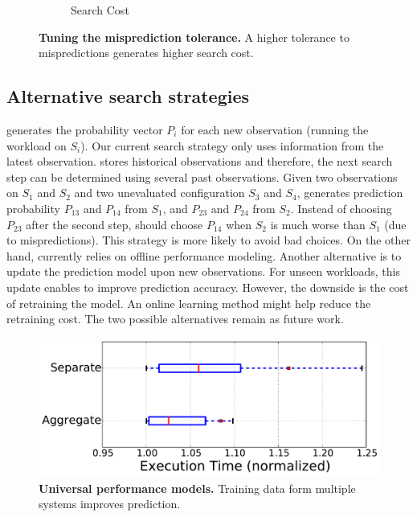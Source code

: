 \begin{figure}[!htbp]
\begin{subfigure}[b]{0.4\textwidth}
    \caption{Search Cost}
    \label{fig:single_cost_tuning_tolerance_performance}
\end{subfigure}
\caption{\small{\textbf{Tuning the misprediction tolerance.} A higher tolerance to mispredictions generates higher search cost.}}
\label{fig:single_misprediction_tolerance}
\end{figure}


\subsection*{Alternative search strategies}
\scout generates the probability vector $P_{i}$
for each new observation (running the workload on $S_i$).
Our current search strategy only uses information from the latest observation.
\scout stores historical observations and therefore,
the next search step can be determined using several past observations.
Given two observations on $S_1$ and $S_2$ and two unevaluated configuration $S_3$ and $S_4$,
\scout generates prediction probability
$P_{13}$ and $P_{14}$ from $S_1$, and $P_{23}$ and $P_{24}$ from $S_2$.
Instead of choosing $P_{23}$ after the second step,
\scout should choose $P_{14}$ when $S_2$ is much worse than $S_1$ (due to mispredictions).
This strategy is more likely to avoid bad choices.
On the other hand, 
\scout currently relies on offline performance modeling.
Another alternative is to update the prediction model upon new observations.
For unseen workloads, this update enables \scout to improve prediction accuracy.
However, the downside is the cost of retraining the model.
An online learning method might help reduce the retraining cost.
The two possible alternatives remain as future work.

\begin{figure}[!htbp]
 \includegraphics[width=.8\textwidth]{figures/multiple_size_of_dataset.pdf}
 \centering
 \caption{\textbf{Universal performance models.}
 Training data form multiple systems improves prediction.}
 \label{fig:prediction_accuracy_comparison}
\end{figure}


